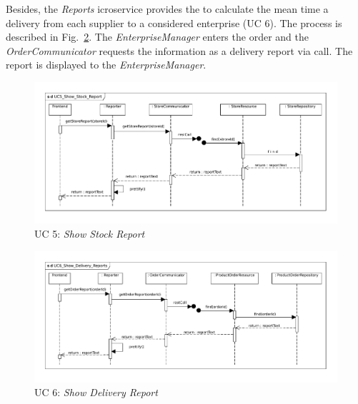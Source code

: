 		Besides, the \textit{Reports} icroservice provides the  to calculate the mean time a delivery  from each supplier to a considered enterprise (UC 6). 
		The process is described in Fig.~\ref{MS_UC6}. 
		The \textit{EnterpriseManager} enters the order  and the \textit{OrderCommunicator} requests the information as a delivery report via  call. 
		The report is displayed to the \textit{EnterpriseManager}.
		
	
			
			\begin{figure}[!h]
				\centering
				\includegraphics[width = 1\textwidth]{img/UC5_Show_Stock_Report.pdf}
				\caption{UC 5: \textit{Show Stock Report}}
				\label{MS_UC5}
			\end{figure}
			
			\begin{figure}[!h]
				\centering
				\includegraphics[width = 1\textwidth]{img/UC6_Show_Delivery_Reports.pdf}
				\caption{UC 6: \textit{Show Delivery Report}}
				\label{MS_UC6}
			\end{figure}
			
